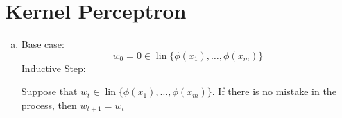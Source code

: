 \documentclass{amsart}
\DeclareMathOperator{\lin}{lin}
\theoremstyle{definition}
\begin{document}
\section{Kernel Perceptron}
\begin{enumerate}[(a)]
  \item 
    Base case:
      \[
        w_0 = 0 \in \lin\{\phi(x_1), \ldots, \phi(x_m)\}
      \]
    Inductive Step:
    
    Suppose that $w_t \in \lin\{\phi(x_1), \ldots, \phi(x_m)\}$. If there is no mistake in the process, then $w_{t+1} = w_t$

\end{enumerate}
\end{document}
